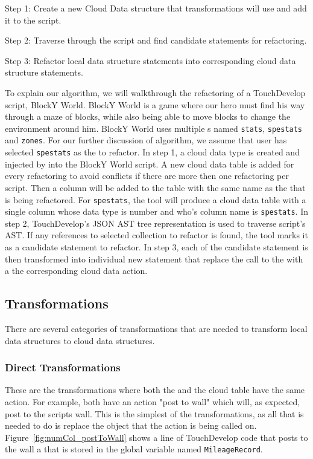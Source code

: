 \documentclass{sigplanconf}
\begin{document}
Step 1: Create a new Cloud Data structure that transformations will use and add it to the script.

Step 2: Traverse through the script and find candidate statements for refactoring.

Step 3: Refactor local data structure statements into corresponding cloud data structure statements.

To explain our algorithm, we will walkthrough the refactoring of a TouchDevelop script, BlockY World.  BlockY World is a game where our hero must find his way through a maze of blocks, while also being able to move blocks to change the environment around him.  BlockY World uses multiple \NC{}s named \texttt{stats}, \texttt{spestats} and \texttt{zones}. For our further discussion of algorithm, we assume that user has selected \texttt{spestats} as the \NC{} to refactor. In step 1, a cloud data type is created and injected by \tool into the BlockY World script.  A new cloud data table is added for every refactoring to avoid conflicts if there are more then one refactoring per script. Then a column will be added to the table with the same name as the \NC{} that is being refactored.  For \texttt{spestats}, the tool will produce a cloud data table with a single column whose data type is number and who's column name is \texttt{spestats}.  In step 2, TouchDevelop's JSON AST tree representation is used to traverse script's AST. If any references to selected collection to refactor is found, the tool marks it as a candidate statement to refactor.  In step 3, each of the candidate statement is then transformed into individual new statement that replace the call to the \NC{} with a the corresponding cloud data action. 

\subsection{Transformations}
There are several categories of transformations that are needed to transform local data structures to cloud data structures.  


\subsubsection{Direct Transformations}
These are the transformations where both the \NC{} and the cloud table have the same action.  For example, both have an action "post to wall" which will, as expected, post to the scripts wall.  This is the simplest of the transformations, as all that is needed to do is replace the object that the action is being called on.  Figure~\ref{fig:numCol_postToWall} shows a line of TouchDevelop code that posts to the wall a \NC{} that is stored in the global variable named \texttt{MileageRecord}.
\end{document}
